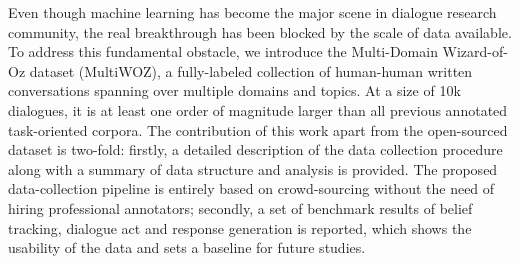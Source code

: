 Even though machine learning has become the major scene in dialogue research community, the real breakthrough has been blocked by the scale of data available.
To address this fundamental obstacle, we introduce the Multi-Domain Wizard-of-Oz dataset (MultiWOZ), a fully-labeled collection of human-human written conversations spanning over multiple domains and topics.
At a size of 10k dialogues, it is at least one order of magnitude larger than all previous annotated task-oriented corpora.
The contribution of this work apart from the open-sourced dataset is two-fold:
firstly, a detailed description of the data collection procedure along with a summary of data structure and analysis is provided. The proposed data-collection pipeline is entirely based on crowd-sourcing without the need of hiring professional annotators;
secondly, a set of benchmark results of belief tracking, dialogue act and response generation is reported, which shows the usability of the data and sets a baseline for future studies.
